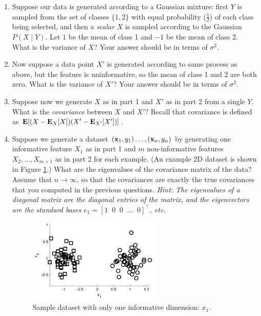 \begin{enumerate}
\item {} Suppose our data is generated according to a Gaussian
  mixture: first $Y$ is sampled from the set of classes $\{1, 2\}$
  with equal probability ($\frac{1}{2}$) of each class being selected,
  and then a {\em scalar} $X$ is sampled according to the Gaussian
  $P(X \mid Y)$. Let $1$ be the mean of class 1 and $-1$ be the mean
  of class 2.  What is the variance of $X$? Your answer should be in
  terms of $\sigma^2$.

\item {} Now suppose a data point $X'$ is generated according
  to same process as above, but the feature is uninformative, so the
  mean of class 1 and 2 are both zero.  What is the variance of $X'$?
  Your answer should be in terms of $\sigma^2$.

\item {} Suppose now we generate $X$ as in part 1 and $X'$ as
  in part 2 from a single $Y$. What is the {\em covariance} between
  $X$ and $X'?$ Recall that covariance is defined as $\mathbf{E}[
    (X-\mathbf{E}_X[X])(X'-\mathbf{E}_{X'}[X']) ]$.

\item {} Suppose we generate a dataset $(\mathbf{x}_1,y_1) \dots,
  (\mathbf{x}_n,y_n)$ by generating one informative feature $X_1$ as in part
  1 and $m$ non-informative features $X_2, \dots, X_{m+1}$ as in part
  2 for each example. (An example 2D dataset is shown in Figure
  \ref{fig:pca-example}.) What are the eigenvalues of the covariance
  matrix of the data? Assume that $n \rightarrow \infty$, so that the
  covariances are exactly the true covariances that you computed in
  the previous questions.  {\em Hint: The eigenvalues of a diagonal
    matrix are the diagonal entries of the matrix, and the
    eigenvectors are the standard bases $e_1 = [1 \;\; 0 \;\; 0 \;\;
      \dots \;\; 0]^\top$, etc.}

  \begin{figure}[h!]
    \centering
    \includegraphics[width=0.6\textwidth]{images/pca_example.png}
    \caption{Sample dataset with only one informative dimension: $x_1$.}
    \label{fig:pca-example}
  \end{figure}


\end{enumerate}
